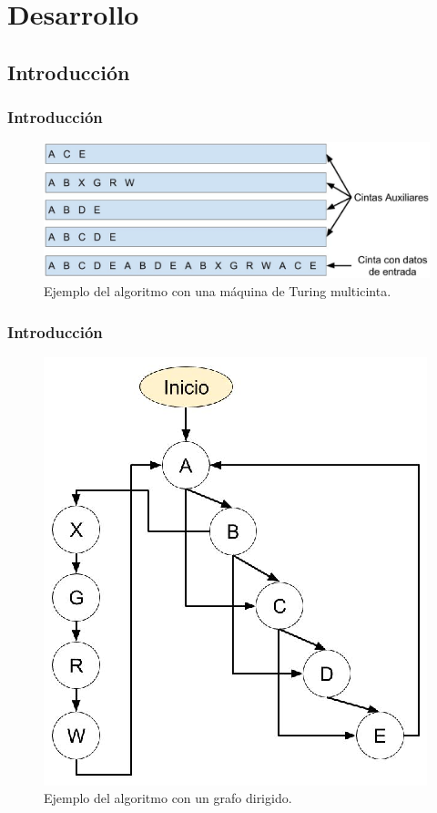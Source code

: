 \section{Desarrollo}

\subsection{Introducci\'on}
\begin{frame}
\frametitle{Introducci\'on}

\begin{figure}[h]
\centering
\includegraphics[width=1.0\columnwidth]{Imagenes/algoritmo1.eps}
\caption{Ejemplo del algoritmo con una m\'aquina de Turing multicinta.}
\label{fig:alg01}
\end{figure}

\end{frame}


\begin{frame}
\frametitle{Introducci\'on}

\begin{figure}[h]
\centering
\includegraphics[width=0.5 \columnwidth]{Imagenes/algoritmo2.eps}
\caption{Ejemplo del algoritmo con un grafo dirigido.}
\label{fig:alg02}
\end{figure}

\end{frame}


